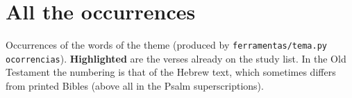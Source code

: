 \chapter{All the occurrences}

Occurrences of the words of the theme (produced by
\texttt{ferramentas/tema.py ocorrencias}). \textbf{\color{destaque}Highlighted}
are the verses already on the study list. In the Old Testament the numbering
is that of the Hebrew text, which sometimes differs from printed Bibles
(above all in the Psalm superscriptions).

\ocorrenciasdotema

